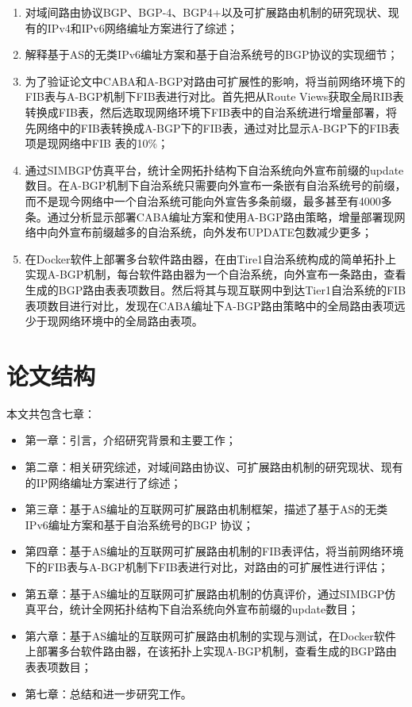 \begin{enumerate}
\item 对域间路由协议BGP、BGP-4、BGP4+以及可扩展路由机制的研究现状、现有的IPv4和IPv6网络编址方案进行了综述；
\item 解释基于AS的无类IPv6编址方案和基于自治系统号的BGP协议的实现细节；
\item 为了验证论文中CABA和A-BGP对路由可扩展性的影响，将当前网络环境下的FIB表与A-BGP机制下FIB表进行对比。首先把从Route Views获取全局RIB表转换成FIB表，然后选取现网络环境下FIB表中的自治系统进行增量部署，将先网络中的FIB表转换成A-BGP下的FIB表，通过对比显示A-BGP下的FIB表项是现网络中FIB 表的10\%；
\item 通过SIMBGP仿真平台，统计全网拓扑结构下自治系统向外宣布前缀的update数目。在A-BGP机制下自治系统只需要向外宣布一条嵌有自治系统号的前缀，而不是现今网络中一个自治系统可能向外宣告多条前缀，最多甚至有4000多条。通过分析显示部署CABA编址方案和使用A-BGP路由策略，增量部署现网络中向外宣布前缀越多的自治系统，向外发布UPDATE包数减少更多；
\item 在Docker软件上部署多台软件路由器，在由Tire1自治系统构成的简单拓扑上实现A-BGP机制，每台软件路由器为一个自治系统，向外宣布一条路由，查看生成的BGP路由表表项数目。然后将其与现互联网中到达Tier1自治系统的FIB表项数目进行对比，发现在CABA编址下A-BGP路由策略中的全局路由表项远少于现网络环境中的全局路由表项。
\end{enumerate}

\section{论文结构}
本文共包含七章：
\begin{itemize}
\item 第一章：引言，介绍研究背景和主要工作；
\item 第二章：相关研究综述，对域间路由协议、可扩展路由机制的研究现状、现有的IP网络编址方案进行了综述；
\item 第三章：基于AS编址的互联网可扩展路由机制框架，描述了基于AS的无类IPv6编址方案和基于自治系统号的BGP 协议；
\item 第四章：基于AS编址的互联网可扩展路由机制的FIB表评估，将当前网络环境下的FIB表与A-BGP机制下FIB表进行对比，对路由的可扩展性进行评估；
\item 第五章：基于AS编址的互联网可扩展路由机制的仿真评价，通过SIMBGP仿真平台，统计全网拓扑结构下自治系统向外宣布前缀的update数目；
\item 第六章：基于AS编址的互联网可扩展路由机制的实现与测试，在Docker软件上部署多台软件路由器，在该拓扑上实现A-BGP机制，查看生成的BGP路由表表项数目；
\item 第七章：总结和进一步研究工作。
\end{itemize}
